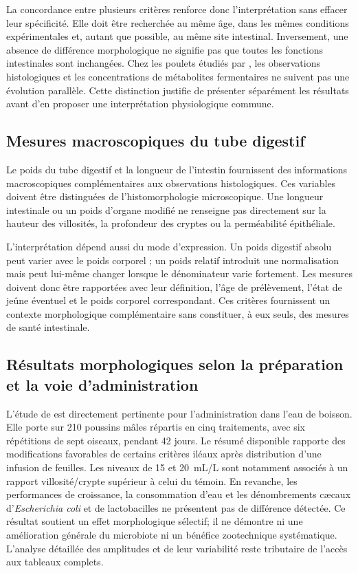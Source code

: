 La concordance entre plusieurs critères renforce donc l'interprétation sans effacer leur spécificité. Elle doit être recherchée au même âge, dans les mêmes conditions expérimentales et, autant que possible, au même site intestinal. Inversement, une absence de différence morphologique ne signifie pas que toutes les fonctions intestinales sont inchangées. Chez les poulets étudiés par \citet{Pirman2021}, les observations histologiques et les concentrations de métabolites fermentaires ne suivent pas une évolution parallèle. Cette distinction justifie de présenter séparément les résultats avant d'en proposer une interprétation physiologique commune.

\subsection{Mesures macroscopiques du tube digestif}

Le poids du tube digestif et la longueur de l'intestin fournissent des informations macroscopiques complémentaires aux observations histologiques. Ces variables doivent être distinguées de l'histomorphologie microscopique. Une longueur intestinale ou un poids d'organe modifié ne renseigne pas directement sur la hauteur des villosités, la profondeur des cryptes ou la perméabilité épithéliale.

L'interprétation dépend aussi du mode d'expression. Un poids digestif absolu peut varier avec le poids corporel ; un poids relatif introduit une normalisation mais peut lui-même changer lorsque le dénominateur varie fortement. Les mesures doivent donc être rapportées avec leur définition, l'âge de prélèvement, l'état de jeûne éventuel et le poids corporel correspondant. Ces critères fournissent un contexte morphologique complémentaire sans constituer, à eux seuls, des mesures de santé intestinale.

\subsection{Résultats morphologiques selon la préparation et la voie d'administration}

L'étude de \citet{Erener2023} est directement pertinente pour l'administration dans l'eau de boisson. Elle porte sur 210 poussins mâles répartis en cinq traitements, avec six répétitions de sept oiseaux, pendant 42 jours. Le résumé disponible rapporte des modifications favorables de certains critères iléaux après distribution d'une infusion de feuilles. Les niveaux de 15 et 20~mL/L sont notamment associés à un rapport villosité/crypte supérieur à celui du témoin. En revanche, les performances de croissance, la consommation d'eau et les dénombrements cæcaux d'\textit{Escherichia coli} et de lactobacilles ne présentent pas de différence détectée. Ce résultat soutient un effet morphologique sélectif; il ne démontre ni une amélioration générale du microbiote ni un bénéfice zootechnique systématique. L'analyse détaillée des amplitudes et de leur variabilité reste tributaire de l'accès aux tableaux complets.

